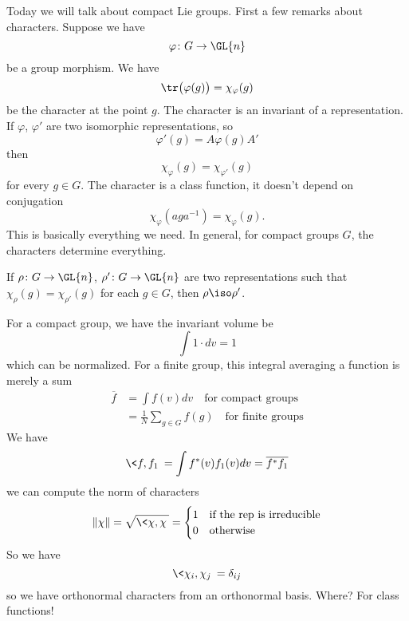 Today we will talk about compact Lie groups. First a few remarks
about characters. Suppose we have
\begin{equation}
\varphi\colon G\to\GL{n}
\end{equation}
be a group morphism. We have
\begin{equation}
\tr\big(\varphi(g)\big)=\chi_{\varphi}(g)
\end{equation}
be the character at the point $g$. The character is an invariant
of a representation. If $\varphi$, $\varphi'$ are two isomorphic
representations, so 
\begin{equation}
\varphi'(g) = A\varphi(g)A'
\end{equation}
then
\begin{equation}
\chi_{\varphi}(g)=\chi_{\varphi'}(g)
\end{equation}
for every $g\in G$. The character is a class function, it doesn't
depend on conjugation
\begin{equation}
\chi_{\varphi}(aga^{-1})=\chi_{\varphi}(g).
\end{equation}
This is basically everything we need. In general, for compact
groups $G$, the characters determine everything.

\begin{thm}
If $\rho\colon G\to\GL{n}$, $\rho'\colon G\to\GL{n}$ are two
representations such that $\chi_{\rho}(g)=\chi_{\rho'}(g)$ for
each $g\in G$, then $\rho\iso\rho'$.
\end{thm}

For a compact group, we have the invariant volume be
\begin{equation}
\int 1\cdot dv = 1
\end{equation}
which can be normalized. For a finite group, this integral
averaging a function is merely a sum
\begin{subequations}
\begin{align}
\overline{f} &= \int f(v)dv\quad\mbox{for compact groups}\\
&= \frac{1}{N}\sum_{g\in G}f(g)\quad\mbox{for finite groups}
\end{align}
\end{subequations}
We have 
\begin{equation}
\<f,f_{1}\> = \int f^{*}(v)f_{1}(v)dv = \overline{f^{*}f_{1}}
\end{equation}
we can compute the norm of characters
\begin{equation}
\|\chi\| = \sqrt{\<\chi,\chi\>} = \begin{cases} 1 & \mbox{if the rep is
  irreducible}\\
0 & \mbox{otherwise}
\end{cases}
\end{equation}
So we have
\begin{equation}
\<\chi_{i},\chi_{j}\>=\delta_{ij}
\end{equation}
so we have orthonormal characters from an orthonormal
basis. Where? For class functions!


